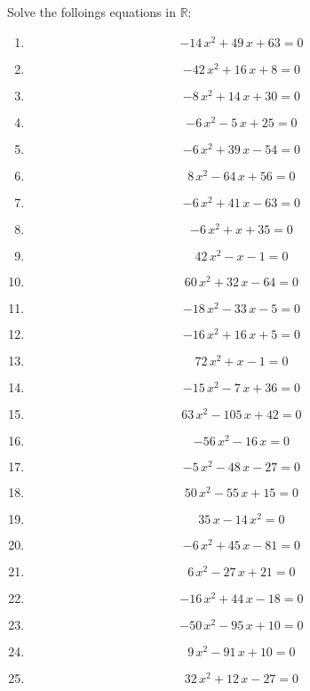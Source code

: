 \item Solve the folloings equations in $\mathbb{R}$:
\begin{enumerate}
\item   \[ -14\,x^2+49\,x+63=0 \]
\item   \[ -42\,x^2+16\,x+8=0 \]
\item   \[ -8\,x^2+14\,x+30=0 \]
\item   \[ -6\,x^2-5\,x+25=0 \]
\item   \[ -6\,x^2+39\,x-54=0 \]
\item   \[ 8\,x^2-64\,x+56=0 \]
\item   \[ -6\,x^2+41\,x-63=0 \]
\item   \[ -6\,x^2+x+35=0 \]
\item   \[ 42\,x^2-x-1=0 \]
\item   \[ 60\,x^2+32\,x-64=0 \]
\item   \[ -18\,x^2-33\,x-5=0 \]
\item   \[ -16\,x^2+16\,x+5=0 \]
\item   \[ 72\,x^2+x-1=0 \]
\item   \[ -15\,x^2-7\,x+36=0 \]
\item   \[ 63\,x^2-105\,x+42=0 \]
\item   \[ -56\,x^2-16\,x=0 \]
\item   \[ -5\,x^2-48\,x-27=0 \]
\item   \[ 50\,x^2-55\,x+15=0 \]
\item   \[ 35\,x-14\,x^2=0 \]
\item   \[ -6\,x^2+45\,x-81=0 \]
\item   \[ 6\,x^2-27\,x+21=0 \]
\item   \[ -16\,x^2+44\,x-18=0 \]
\item   \[ -50\,x^2-95\,x+10=0 \]
\item   \[ 9\,x^2-91\,x+10=0 \]
\item   \[ 32\,x^2+12\,x-27=0 \]
\end{enumerate}